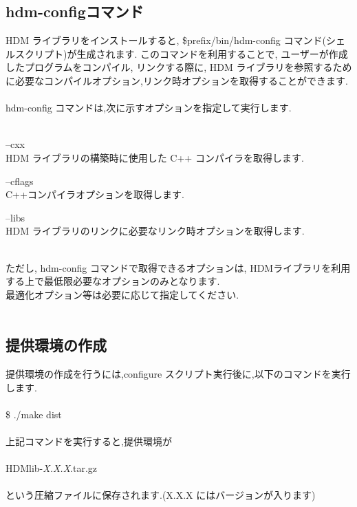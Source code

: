 \documentclass[twoside]{jbook}
\begin{document}
\begin{itemize}
\subsection{hdm-configコマンド}
HDM ライブラリをインストールすると, \$prefix/bin/hdm-config コマンド(シェルスクリプト)が生成されます. このコマンドを利用することで, ユーザーが作成したプログラムをコンパイル, リンクする際に, HDM ライブラリを参照するために必要なコンパイルオプション,リンク時オプションを取得することができます.\\\\
hdm-config コマンドは,次に示すオプションを指定して実行します.\\\\

\begin{description}
\item --cxx\\
HDM ライブラリの構築時に使用した C++ コンパイラを取得します.

\item --cflags\\
C++コンパイラオプションを取得します.

\item --libs\\
HDM ライブラリのリンクに必要なリンク時オプションを取得します.\\\\

\end{description}

ただし, hdm-config コマンドで取得できるオプションは, HDMライブラリを利用する上で最低限必要なオプションのみとなります.\\
最適化オプション等は必要に応じて指定してください.\\\\

\subsection{提供環境の作成}
提供環境の作成を行うには,configure スクリプト実行後に,以下のコマンドを実行します.\\\\
{\sf \$ ./make dist}\\\\
上記コマンドを実行すると,提供環境が\\\\
{\sf HDMlib-{\it X.X.X}.tar.gz}\\\\
という圧縮ファイルに保存されます.(X.X.X にはバージョンが入ります)


\end{itemize}
\end{document}

